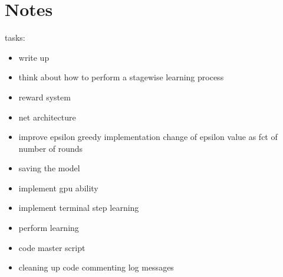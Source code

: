 \section{Notes}

tasks:
\begin{itemize}
\item write up
\item think about how to perform a stagewise learning process
\item reward system
\item net architecture
\item improve epsilon greedy implementation
\subitem change of epsilon value as fct of number of rounds
\item saving the model
\item implement gpu ability
\item implement terminal step learning
\item perform learning
\item code master script
\item cleaning up code
\subitem commenting
\subitem log messages
\end{itemize}